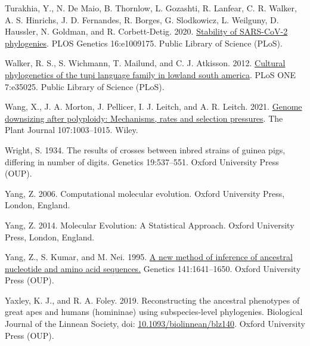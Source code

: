 \documentclass{article}
\newlength{\cslhangindent}
\newenvironment{CSLReferences}[2] %
 {\begin{list}{}{%
  \setlength{\itemindent}{0pt}
  \setlength{\leftmargin}{0pt}
  \setlength{\parsep}{0pt}
  \ifodd #1
   \setlength{\leftmargin}{\cslhangindent}
   \setlength{\itemindent}{-1\cslhangindent}
  \fi
  \setlength{\itemsep}{#2\baselineskip}}}
 {\end{list}}
\begin{document}
\begin{CSLReferences}{1}{0}
Turakhia, Y., N. De Maio, B. Thornlow, L. Gozashti, R. Lanfear, C. R. Walker, A. S. Hinrichs, J. D. Fernandes, R. Borges, G. Slodkowicz, L. Weilguny, D. Haussler, N. Goldman, and R. Corbett-Detig. 2020. \href{https://doi.org/10.1371/journal.pgen.1009175}{Stability of SARS-CoV-2 phylogenies}. PLOS Genetics 16:e1009175. Public Library of Science (PLoS).

Walker, R. S., S. Wichmann, T. Mailund, and C. J. Atkisson. 2012. \href{https://doi.org/10.1371/journal.pone.0035025}{Cultural phylogenetics of the tupi language family in lowland south america}. PLoS ONE 7:e35025. Public Library of Science (PLoS).

Wang, X., J. A. Morton, J. Pellicer, I. J. Leitch, and A. R. Leitch. 2021. \href{https://doi.org/10.1111/tpj.15363}{Genome downsizing after polyploidy: Mechanisms, rates and selection pressures}. The Plant Journal 107:1003--1015. Wiley.

Wright, S. 1934. The results of crosses between inbred strains of guinea pigs, differing in number of digits. Genetics 19:537--551. Oxford University Press (OUP).

Yang, Z. 2006. Computational molecular evolution. Oxford University Press, London, England.

Yang, Z. 2014. Molecular {E}volution: A {S}tatistical {A}pproach. Oxford University Press, London, England.

Yang, Z., S. Kumar, and M. Nei. 1995. \href{https://doi.org/10.1093/genetics/141.4.1641}{A new method of inference of ancestral nucleotide and amino acid sequences.} Genetics 141:1641--1650. Oxford University Press (OUP).

Yaxley, K. J., and R. A. Foley. 2019. Reconstructing the ancestral phenotypes of great apes and humans (homininae) using subspecies-level phylogenies. Biological Journal of the Linnean Society, doi: \href{https://doi.org/10.1093/biolinnean/blz140}{10.1093/biolinnean/blz140}. Oxford University Press (OUP).

\end{CSLReferences}



\end{document}
